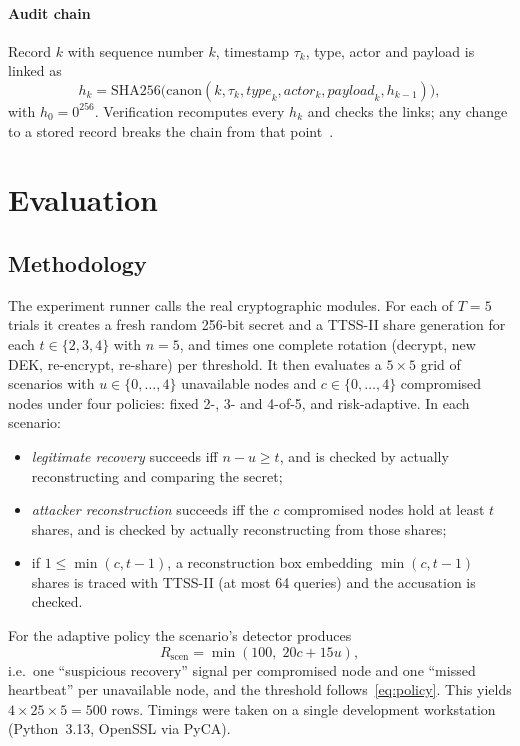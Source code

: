 \documentclass[conference]{IEEEtran}
\begin{document}
\paragraph*{Audit chain} Record $k$ with sequence number $k$, timestamp $\tau_k$, type, actor and payload is linked as
\begin{equation}
  h_k = \mathrm{SHA256}\bigl(\mathrm{canon}(k, \tau_k, \mathit{type}_k, \mathit{actor}_k, \mathit{payload}_k, h_{k-1})\bigr),
  \label{eq:audit}
\end{equation}
with $h_0 = 0^{256}$. Verification recomputes every $h_k$ and checks the links; any change to a stored record breaks the chain from that point~\cite{crosby2009tamper}.

\section{Evaluation}
\label{sec:eval}

\subsection{Methodology}
The experiment runner calls the real cryptographic modules. For each of $T=5$ trials it creates a fresh random 256-bit secret and a TTSS-II share generation for each $t\in\{2,3,4\}$ with $n=5$, and times one complete rotation (decrypt, new DEK, re-encrypt, re-share) per threshold. It then evaluates a $5\times5$ grid of scenarios with $u\in\{0,\dots,4\}$ unavailable nodes and $c\in\{0,\dots,4\}$ compromised nodes under four policies: fixed 2-, 3- and 4-of-5, and risk-adaptive. In each scenario:
\begin{itemize}
  \item \emph{legitimate recovery} succeeds iff $n-u \ge t$, and is checked by actually reconstructing and comparing the secret;
  \item \emph{attacker reconstruction} succeeds iff the $c$ compromised nodes hold at least $t$ shares, and is checked by actually reconstructing from those shares;
  \item if $1\le \min(c, t-1)$, a reconstruction box embedding $\min(c,t-1)$ shares is traced with TTSS-II (at most 64 queries) and the accusation is checked.
\end{itemize}
For the adaptive policy the scenario's detector produces
\begin{equation}
  R_{\text{scen}} = \min(100,\; 20c + 15u),
  \label{eq:scen}
\end{equation}
i.e.\ one ``suspicious recovery'' signal per compromised node and one ``missed heartbeat'' per unavailable node, and the threshold follows~\eqref{eq:policy}. This yields $4\times 25\times 5 = 500$ rows. Timings were taken on a single development workstation (Python~3.13, OpenSSL via PyCA).
\end{document}
